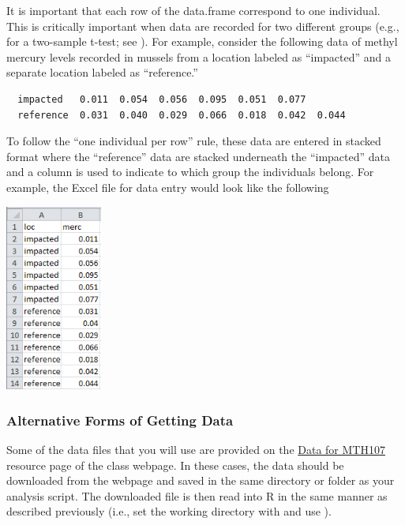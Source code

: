 \documentclass[10pt,openany]{book}\usepackage[]{graphicx}\usepackage[]{color}
\begin{document}

It is important that each row of the data.frame correspond to one individual.  This is critically important when data are recorded for two different groups (e.g., for a two-sample t-test; see ).  For example, consider the following data of methyl mercury levels recorded in mussels from a location labeled as ``impacted'' and a separate location labeled as ``reference.''
\begin{Verbatim}
  impacted   0.011  0.054  0.056  0.095  0.051  0.077
  reference  0.031  0.040  0.029  0.066  0.018  0.042  0.044
\end{Verbatim}
To follow the ``one individual per row'' rule, these data are entered in stacked format where the ``reference'' data are stacked underneath the ``impacted'' data and a column is used to indicate to which group the individuals belong.  For example, the Excel file for data entry would look like the following

\begin{center}
  \includegraphics[width=1.25in]{Figs/StackedData.jpg}
\end{center}


\subsubsection*{Alternative Forms of Getting Data} \label{sect:RAltData}
Some of the data files that you will use are provided on the \href{http://derekogle.com/NCMTH107/resources/data_107}{Data for MTH107} resource page of the class webpage.  In these cases, the data should be downloaded from the webpage and saved in the same directory or folder as your analysis script.  The downloaded file is then read into R in the same manner as described previously (i.e., set the working directory with  and use ).
\end{document}
